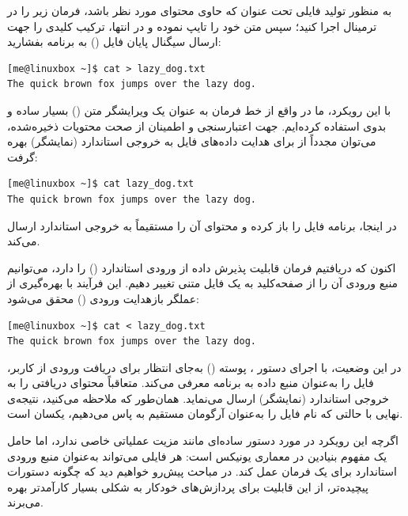 به منظور تولید فایلی تحت عنوان  که حاوی محتوای مورد نظر باشد، فرمان زیر را در ترمینال اجرا کنید؛ سپس متن خود را تایپ نموده و در انتها، ترکیب کلیدی  را جهت ارسال سیگنال پایان فایل () به برنامه بفشارید:

\begin{latin}
\begin{lstlisting}
[me@linuxbox ~]$ cat > lazy_dog.txt
The quick brown fox jumps over the lazy dog.
\end{lstlisting}
\end{latin}

با این رویکرد، ما در واقع از خط فرمان به عنوان یک ویرایشگر متن () بسیار ساده و بدوی استفاده کرده‌ایم. جهت اعتبارسنجی و اطمینان از صحت محتویات ذخیره‌شده، می‌توان مجدداً از  برای هدایت داده‌های فایل به خروجی استاندارد (نمایشگر) بهره گرفت:

\begin{latin}
\begin{lstlisting}
[me@linuxbox ~]$ cat lazy_dog.txt
The quick brown fox jumps over the lazy dog.
\end{lstlisting}
\end{latin}

در اینجا، برنامه فایل را باز کرده و محتوای آن را مستقیماً به خروجی استاندارد ارسال می‌کند.

اکنون که دریافتیم فرمان  قابلیت پذیرش داده از ورودی استاندارد () را دارد، می‌توانیم منبع ورودی آن را از صفحه‌کلید به یک فایل متنی تغییر دهیم. این فرآیند با بهره‌گیری از عملگر بازهدایت ورودی (\cmd{<}) محقق می‌شود:

\begin{latin}
\begin{lstlisting}
[me@linuxbox ~]$ cat < lazy_dog.txt
The quick brown fox jumps over the lazy dog.
\end{lstlisting}
\end{latin}

در این وضعیت، با اجرای دستور ، پوسته () به‌جای انتظار برای دریافت ورودی از کاربر، فایل  را به‌عنوان منبع داده به برنامه معرفی می‌کند. متعاقباً  محتوای دریافتی را به خروجی استاندارد (نمایشگر) ارسال می‌نماید. همان‌طور که ملاحظه می‌کنید، نتیجه‌ی نهایی با حالتی که نام فایل را به‌عنوان آرگومان مستقیم به  پاس می‌دهیم، یکسان است.

اگرچه این رویکرد در مورد دستور ساده‌ای مانند  مزیت عملیاتی خاصی ندارد، اما حامل یک مفهوم بنیادین در معماری یونیکس است: هر فایلی می‌تواند به‌عنوان منبع ورودی استاندارد برای یک فرمان عمل کند. در مباحث پیش‌رو خواهیم دید که چگونه دستورات پیچیده‌تر، از این قابلیت برای پردازش‌های خودکار به شکلی بسیار کارآمدتر بهره می‌برند.

